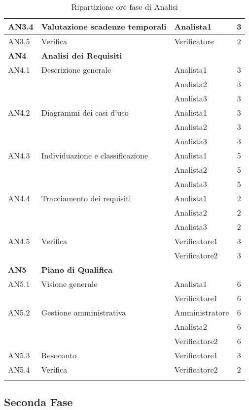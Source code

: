 \begin{longtable}{|l|l|l|c|}
      	\hline
      	{AN3.4} & {Valutazione scadenze temporali} & Analista1  & 3 \\
      	\hline
      	{AN3.5} & {Verifica} & Verificatore  & 2 \\
      \hline
      \textbf{AN4} & \textbf{Analisi dei Requisiti} & &  \\
         \hline
         {AN4.1} & {Descrizione generale} & Analista1  &  3\\
         & & Analista2 & 3\\
         & & Analista3 & 3\\
         \hline
         {AN4.2} & {Diagrammi dei casi d'uso} & Analista1  &  3\\
         & & Analista2 & 3\\
         & & Analista3 & 3\\
         \hline
         {AN4.3} & {Individuazione e classificazione} & Analista1  &  5\\
         & & Analista2 & 5\\
         & & Analista3 & 5\\
         \hline
         {AN4.4} & {Tracciamento dei requisiti} & Analista1  &  2\\
         & & Analista2 & 2\\
         & & Analista3 & 2\\
         \hline
         {AN4.5} & {Verifica} & Verificatore1  &  3\\
         & & Verificatore2 & 3\\
     \hline
     \textbf{AN5} & \textbf{Piano di Qualifica} & &  \\
         \hline
         {AN5.1} & {Visione generale} & Analista1 &  6 \\
         & & Verificatore1 & 6\\
         \hline
         {AN5.2} & {Gestione amministrativa} & Amministratore  &  6\\
         & & Analista2 & 6\\
         & & Verificatore2 & 6\\
         \hline
         {AN5.3} & {Resoconto} & Verificatore1 &  3\\
         \hline
         {AN5.4} & {Verifica} & Verificatore2 &  2 \\
     \hline
     \caption{Ripartizione ore fase di Analisi}
\end{longtable}
\egroup
  



\subsection{Seconda Fase}
